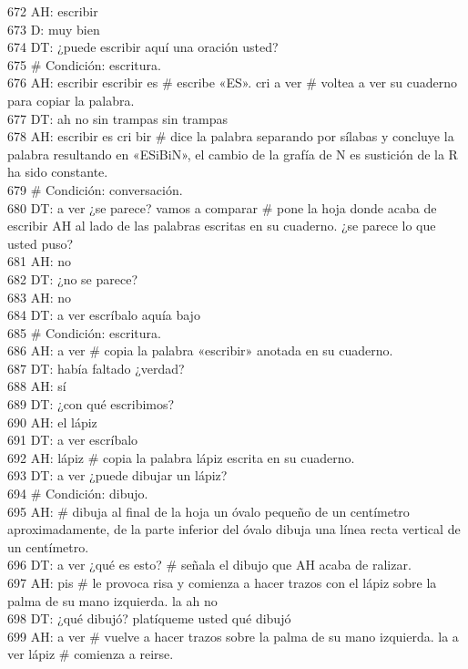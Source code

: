 672 AH: escribir\\
673 D: muy bien\\
674 DT: ¿puede escribir aquí una oración usted?\\
675 # Condición: escritura.\\
676 AH: escribir escribir es # escribe «ES». cri a ver # voltea a ver su cuaderno para copiar la palabra. \\
677 DT: ah no sin trampas sin trampas\\
678 AH: escribir es cri bir # dice la palabra separando por sílabas y concluye la palabra resultando en «ESiBiN», el cambio de la grafía de N es sustición de la R ha sido constante.\\
679 # Condición: conversación.\\
680 DT: a ver ¿se parece? vamos a comparar # pone la hoja donde acaba de escribir AH al lado de las palabras escritas en su cuaderno. ¿se parece lo que usted puso?\\
681 AH: no\\
682 DT: ¿no se parece?\\
683 AH: no\\
684 DT: a ver escríbalo aquía bajo\\
685 # Condición: escritura.\\
686 AH: a ver # copia la palabra «escribir» anotada en su cuaderno.\\
687 DT: había faltado ¿verdad?\\
688 AH: sí\\
689 DT: ¿con qué escribimos?\\
690 AH: el lápiz\\
691 DT: a ver escríbalo\\
692 AH: lápiz # copia la palabra lápiz escrita en su cuaderno.\\
693 DT: a ver ¿puede dibujar un lápiz?\\
694 # Condición: dibujo.\\
695 AH: # dibuja al final de la hoja un óvalo pequeño de un centímetro aproximadamente, de la parte inferior del óvalo dibuja una línea recta vertical de un centímetro.\\
696 DT: a ver ¿qué es esto? # señala el dibujo que AH acaba de ralizar.\\
697 AH: pis # le provoca risa y comienza a hacer trazos con el lápiz sobre la palma de su mano izquierda. la ah no\\
698 DT: ¿qué dibujó? platíqueme usted qué dibujó\\
699 AH: a ver # vuelve a hacer trazos sobre la palma de su mano izquierda. la a ver lápiz # comienza a reirse. \\
